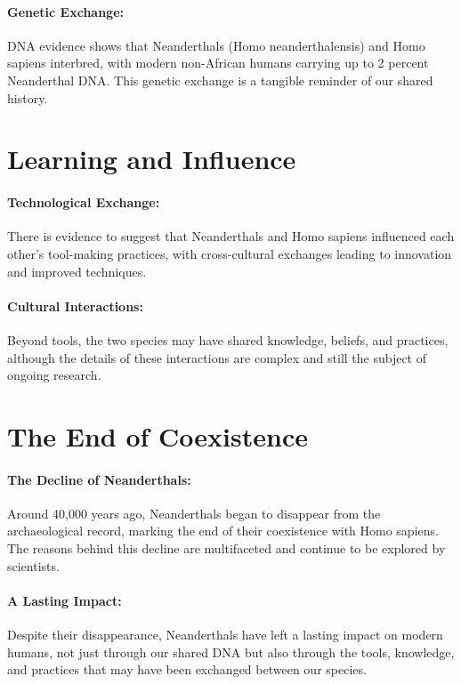 \documentclass{book}
\begin{document}
\paragraph{Genetic Exchange:}
DNA evidence shows that Neanderthals (Homo neanderthalensis) and Homo sapiens interbred, with modern non-African humans carrying up to 2 percent Neanderthal DNA. This genetic exchange is a tangible reminder of our shared history.

\section*{Learning and Influence}

\paragraph{Technological Exchange:}
There is evidence to suggest that Neanderthals and Homo sapiens influenced each other’s tool-making practices, with cross-cultural exchanges leading to innovation and improved techniques.

\paragraph{Cultural Interactions:}
Beyond tools, the two species may have shared knowledge, beliefs, and practices, although the details of these interactions are complex and still the subject of ongoing research.

\section*{The End of Coexistence}

\paragraph{The Decline of Neanderthals:}
Around 40,000 years ago, Neanderthals began to disappear from the archaeological record, marking the end of their coexistence with Homo sapiens. The reasons behind this decline are multifaceted and continue to be explored by scientists.

\paragraph{A Lasting Impact:}
Despite their disappearance, Neanderthals have left a lasting impact on modern humans, not just through our shared DNA but also through the tools, knowledge, and practices that may have been exchanged between our species.
\end{document}
